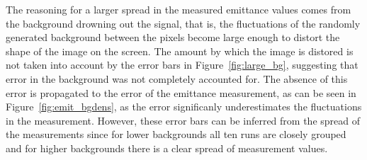 The reasoning for a larger spread in the measured emittance values comes from
the background drowning out the signal, that is, the fluctuations of the
randomly generated background between the pixels become large enough to distort
the shape of the image on the screen.  The amount by which the image is distored
is not taken into account by the error bars in Figure~\ref{fig:large_bg},
suggesting that error in the background was not completely accounted for. The
absence of this error is propagated to the error of the emittance measurement,
as can be seen in Figure~\ref{fig:emit_bgdens}, as the error significanly
underestimates the fluctuations in the measurement.  However, these error bars
can be inferred from the spread of the measurements since for lower backgrounds
all ten runs are closely grouped and for higher backgrounds there is a clear
spread of measurement values.





